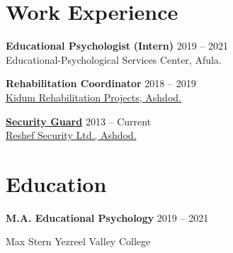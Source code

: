 \documentclass[
	12pt,a4paper %
]{article}
\newcommand{\jobentry}[5]{
	{\raggedleft\textsc{#1\expandafter\ifstrequal\expandafter{#2}{}{}{\hspace{6pt}\footnotesize{(#2)}}}\par} %
	\expandafter\ifstrequal\expandafter{#3}{}{}{{\raggedright\large #3}\\} %
	\expandafter\ifstrequal\expandafter{#4}{}{}{{\raggedright\large\textit{\textbf{#4}}}\\[4pt]} %
	\expandafter\ifstrequal\expandafter{#5}{}{}{#5} %
	\medskip %
}
\begin{document}
\section{Work Experience}





\textbf{\large Educational Psychologist} \textbf{(Intern)} \hfill 2019 -- 2021 \\
{Educational-Psychological Services Center, Afula.}

\noindent\dotfill %

\noindent\textbf{\large Rehabilitation Coordinator} \hfill 2018 -- 2019 \\
\href{http://www.kidumpro.co.il/}{Kidum Rehabilitation Projects, Ashdod.}

\noindent\dotfill %

\noindent\href{https://loona-il.000webhostapp.com/resume-references/recommendation-letter-security-guard.jpg}{\large \textbf{Security Guard}} \hfill 2013 -- Current \\
\href{https://loona-il.000webhostapp.com/resume-references/recommendation-letter-security-guard.jpg}{Reshef Security Ltd., Ashdod.}


\section{Education}

\textbf{\large M.A. Educational Psychology} \hfill 2019 -- 2021

\noindent Max Stern Yezreel Valley College
\end{document}
